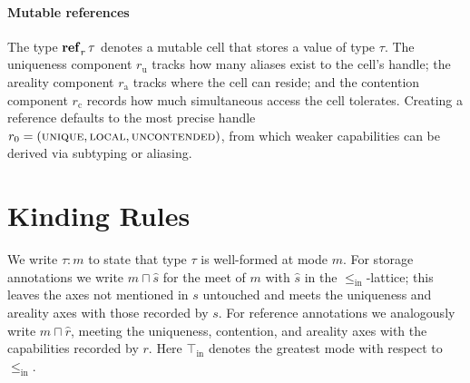 \documentclass{article}
\newcommand{\kw}[1]{\text{\textbf{#1}}}
\newcommand{\AnnotSub}[1]{%
  \if\relax\detokenize{#1}\relax
  \else
    _{\smash{\raisebox{-0.25ex}{$\scriptstyle #1$}}}
  \fi}
\newcommand{\AnnotArrow}[1]{%
  \if\relax\detokenize{#1}\relax
    \to
  \else
    \xrightarrow[\AnnotBelow{#1}]{}
  \fi}
\newcommand{\AnnotBinop}[2]{%
  \if\relax\detokenize{#2}\relax
    #1
  \else
    \underset{\AnnotBelow{#2}}{#1}
  \fi}
\newcommand{\AnnotBelow}[1]{\smash{\raisebox{0.25ex}{$\scriptstyle #1$}}}
\newcommand{\TFun}[3][]{#2 \mathrel{\AnnotArrow{#1}} #3}
\newcommand{\TPair}[3][]{#2 \mathbin{\AnnotBinop{\times}{#1}} #3}
\newcommand{\TSum}[3][]{#2 \mathbin{\AnnotBinop{+}{#1}} #3}
\newcommand{\TRef}[2][]{\kw{ref}\AnnotSub{#1}\, #2}
\newcommand{\TUnit}{\kw{unit}}
\newcommand{\TEmpty}{\kw{empty}}
\newcommand{\leqin}{\mathrel{\leq_{\mathrm{in}}}}
\newcommand{\mode}[1]{\textsc{#1}}
\begin{document}
\paragraph{Mutable references}

The type $\TRef[r]{\tau}$ denotes a mutable cell that stores a value of type $\tau$.
The uniqueness component $r_{\text{u}}$ tracks how many aliases exist to the cell's handle; the areality component $r_{\text{a}}$ tracks where the cell can reside; and the contention component $r_{\text{c}}$ records how much simultaneous access the cell tolerates.
Creating a reference defaults to the most precise handle $r_0 = (\mode{unique}, \mode{local}, \mode{uncontended})$, from which weaker capabilities can be derived via subtyping or aliasing.

\bigskip

\section{Kinding Rules}

We write $\tau : m$ to state that type $\tau$ is well-formed at mode $m$.
For storage annotations we write $m \sqcap \hat{s}$ for the meet of $m$ with $\hat{s}$ in the $\leqin$-lattice; this leaves the axes not mentioned in $s$ untouched and meets the uniqueness and areality axes with those recorded by $s$.
For reference annotations we analogously write $m \sqcap \hat{r}$, meeting the uniqueness, contention, and areality axes with the capabilities recorded by $r$.
Here $\top_{\mathrm{in}}$ denotes the greatest mode with respect to $\leqin$.

\end{document}
